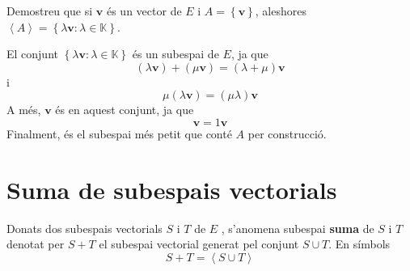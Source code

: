 \begin{exemple}
Demostreu que si $\mathbf{v}$ és un vector de $E$ i $A=\left\{ 
\mathbf{v}\right\} $, aleshores $\left\langle A\right\rangle =\left\{ \lambda 
\mathbf{v}:\lambda \in \mathbb{K}\right\} $.

\end{exemple}
\begin{solucio}
El conjunt $\left\{ \lambda \mathbf{v}:\lambda \in \mathbb{K}\right\} $ és
un subespai de $E$, ja que%
\begin{equation*}
(\lambda \mathbf{v})+(\mu \mathbf{v})=(\lambda +\mu )\mathbf{v}
\end{equation*}%
i%
\begin{equation*}
\mu (\lambda \mathbf{v})=(\mu \lambda )\mathbf{v}
\end{equation*}%
A més, $\mathbf{v}$ és en aquest conjunt, ja que%
\begin{equation*}
\mathbf{v}=1\mathbf{v}
\end{equation*}%
Finalment, és el subespai més petit que conté $A$ per construcció.
\end{solucio}

\section{Suma de subespais vectorials}

\begin{definicio}
Donats dos subespais vectorials $S$ i $T$ de $E$%
, s’anomena subespai \textbf{suma} de $S$ i $T$ denotat
per $S+T$ el subespai vectorial generat pel
conjunt $S\cup T$. En símbols%
\begin{equation*}
S+T=\left\langle S\cup T\right\rangle
\end{equation*}
\end{definicio}


